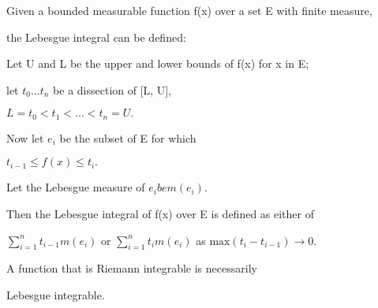 Given a bounded measurable function f(x) over a set E with finite measure,

the Lebesgue integral can be defined:

\par
Let U and L be the upper and lower bounds of f(x) for x in E;

let $t_{0}...t_{n}$  be a dissection of [L, U], 

$ L=t_0 \lt t_1 \lt \ldots \lt t_n = U . $

Now let $e_{i}$  be the subset of E for which 

$ t_{i-1} \leq f(x) \leq t_i . $

\par
Let the Lebesgue measure of $e_{i} be m(e_{i}).$ 

Then the Lebesgue integral of f(x) over E is defined as either of

$ \sum _{i=1} ^{n} t_{i-1}m(e_i) $ or $ \sum _{i=1} ^n

t_i m(e_i) $ as $ \text{max} ( t_i - t_{i-1} ) \to 0 . $

\par
A function that is Riemann integrable is necessarily

Lebesgue integrable.